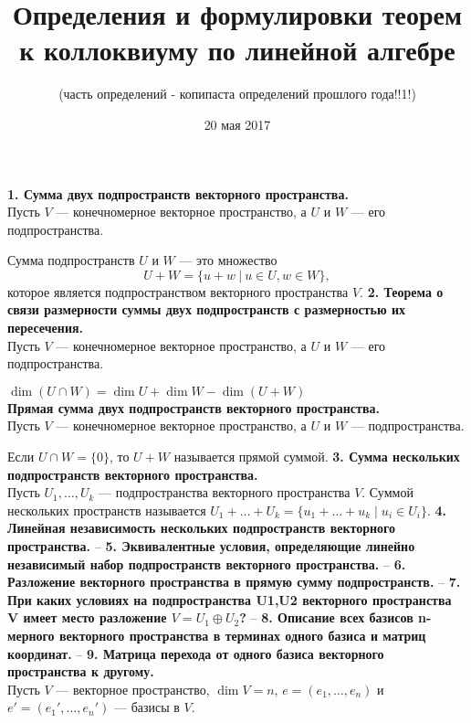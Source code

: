 \documentclass{article}
\title{Определения и формулировки теорем к коллоквиуму по линейной алгебре}
\author{(часть определений - копипаста определений прошлого года!!1!)}
\date{20 мая 2017}
\begin{document}
             
\maketitle
\noindent \textbf{1. Сумма двух подпространств векторного пространства.}\\

Пусть $V$ --- конечномерное векторное пространство, а $U$ и $W$ --- его подпространства.

Сумма подпространств $U$ и $W$ --- это множество
\[
U+W = \{u + w\ |\ u \in U, w \in W\},
\]
которое является подпространством векторного пространства $V$.
\newline
\newline
\textbf{2. Теорема о связи размерности суммы двух подпространств с размерностью их пересечения.}\\
Пусть $V$ --- конечномерное векторное пространство, а $U$ и $W$ --- его подпространства.

$\dim \left(U \cap W\right) = \dim U + \dim W - \dim \left(U+W\right)$
\\
\textbf{Прямая сумма двух подпространств векторного пространства.}\\
Пусть $V$ --- конечномерное векторное пространство, а $U$ и $W$ --- подпространства.

Если $U \cap W = \{0\}$, то $U + W$ называется прямой суммой.
\newline
\newline
\textbf{3. Сумма нескольких подпространств векторного пространства.}\\
Пусть $U_1, \ldots, U_k$ --- подпространства векторного пространства $V$. Суммой нескольких пространств называется $U_1 + \ldots + U_k = \{u_1 + \ldots + u_k \; | \; u_i \in U_i \}$.
\newline
\newline
\textbf{4. Линейная независимость нескольких подпространств векторного пространства.}
--
\newline
\newline
\textbf{5. Эквивалентные условия, определяющие линейно независимый набор подпространств векторного пространства.}
--
\newline
\newline
\textbf{6. Разложение векторного пространства в прямую сумму подпространств.}
--
\newline
\newline
\textbf{7. При каких условиях на подпространства U1,U2 векторного пространства V имеет место разложение $V =U_1\oplus U_2$?}
--
\newline
\newline
\textbf{8. Описание всех базисов n-мерного векторного пространства в терминах одного базиса и матриц координат.}
--
\newline
\newline
\textbf{9. Матрица перехода от одного базиса векторного пространства к другому.}\\
Пусть $V$ --- векторное пространство, $\dim V = n$, $e = (e_1, \ldots, e_n)$ и $e' =(e_1', \ldots, e_n')$ --- базисы в $V$.
\end{document}
